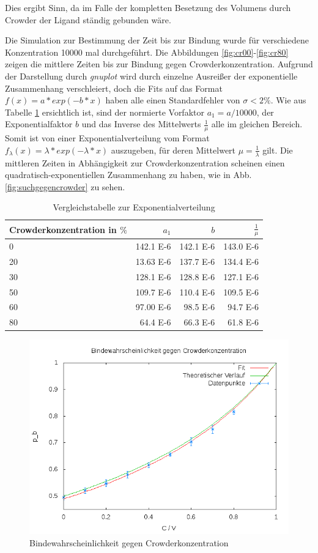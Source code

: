 \documentclass[bachelor,       %
               twoside,        %
               BCOR10mm,       %
               english,ngerman, %
               ]{GAUBM}
\begin{document}
Dies ergibt Sinn, da im Falle der kompletten Besetzung des Volumens durch Crowder der
Ligand ständig gebunden wäre.

Die Simulation zur Bestimmung der Zeit bis zur Bindung wurde für verschiedene
Konzentration 10000 mal durchgeführt.
Die Abbildungen \ref{fig:cr00}-\ref{fig:cr80} zeigen die mittlere Zeiten bis zur Bindung
gegen Crowderkonzentration. Aufgrund der Darstellung durch \emph{gnuplot} wird durch einzelne
Ausreißer der exponentielle Zusammenhang verschleiert, doch die Fits auf das
Format $f(x) = a*exp(-b*x)$ haben alle einen Standardfehler von
$\sigma < 2\%$.
Wie aus Tabelle \ref{tab} ersichtlich ist, sind der normierte Vorfaktor $a_1 = a / 10000$,
der Exponentialfaktor $b$ und das Inverse des Mittelwerts $\frac{1}{\mu}$ alle
im gleichen Bereich. Somit ist von einer Exponentialverteilung vom Format
$f_{\lambda}(x) = \lambda*exp(-\lambda*x)$ auszugeben, für deren Mittelwert $\mu = \frac{1}{\lambda}$ gilt.
Die mittleren Zeiten in Abhängigkeit zur Crowderkonzentration scheinen einen
quadratisch-exponentiellen Zusammenhang zu haben, wie in Abb. \ref{fig:suchgegencrowder} zu sehen.

\begin{table}
\begin{tabular}{l || r | r |  r}
Crowderkonzentration in $\%$ & $a_1$ & $b$ & $\frac{1}{\mu}$ \\ \hline
0 & 142.1 E-6 & 142.1 E-6 & 143.0 E-6 \\
20 & 13.63 E-6 & 137.7 E-6 & 134.4 E-6 \\
30 & 128.1 E-6 & 128.8 E-6 & 127.1 E-6 \\
50 & 109.7 E-6 & 110.4 E-6 & 109.5 E-6 \\
60 & 97.00 E-6 & 98.5 E-6 & 94.7 E-6 \\
80 & 64.4 E-6 & 66.3 E-6 &  61.8 E-6 \\
\end{tabular}
\caption{Vergleichstabelle zur Exponentialverteilung}
\label{tab}
\end{table}

\begin{figure}
  \centering
  \includegraphics[width=0.9\linewidth]{ProbgegenCrowder.png}
  \caption{Bindewahrscheinlichkeit gegen Crowderkonzentration}
  \label{fig:ProbGegenCrowder}
\end{figure}
\end{document}
